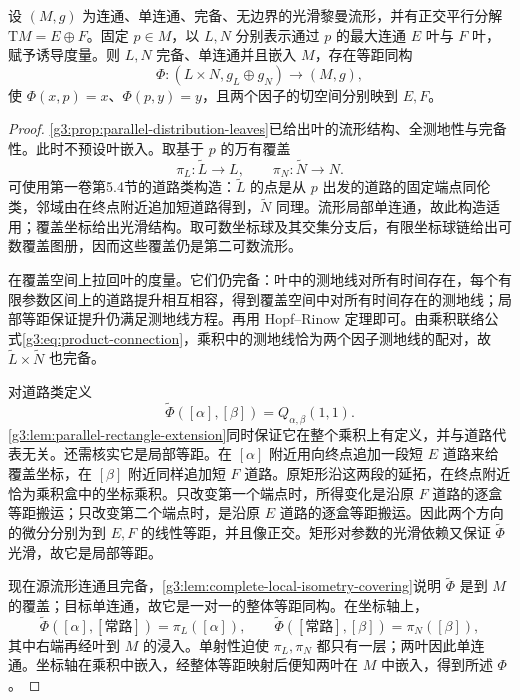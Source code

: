 \begin{theorem}\label{g3:thm:global-parallel-product}
	设 \((M,g)\) 为连通、单连通、完备、无边界的光滑黎曼流形，并有正交平行分解
	\(\mathrm{T}M=E\oplus F\)。固定 \(p\in M\)，以 \(L,N\) 分别表示通过 \(p\) 的最大连通 \(E\) 叶与 \(F\) 叶，赋予诱导度量。则 \(L,N\) 完备、单连通并且嵌入 \(M\)，存在等距同构
	\[
		\Phi:(L\times N,g_L\oplus g_N)\longrightarrow(M,g),
	\]
	使 \(\Phi(x,p)=x\)、\(\Phi(p,y)=y\)，且两个因子的切空间分别映到 \(E,F\)。
\end{theorem}
\begin{proof}
	\cref{g3:prop:parallel-distribution-leaves}已给出叶的流形结构、全测地性与完备性。此时不预设叶嵌入。取基于 \(p\) 的万有覆盖
	\[
		\pi_L:\widetilde L\longrightarrow L,\qquad
		\pi_N:\widetilde N\longrightarrow N.
	\]
	可使用第一卷第5.4节的道路类构造：\(\widetilde L\) 的点是从 \(p\) 出发的道路的固定端点同伦类，邻域由在终点附近追加短道路得到，\(\widetilde N\) 同理。流形局部单连通，故此构造适用；覆盖坐标给出光滑结构。取可数坐标球及其交集分支后，有限坐标球链给出可数覆盖图册，因而这些覆盖仍是第二可数流形。

	在覆盖空间上拉回叶的度量。它们仍完备：叶中的测地线对所有时间存在，每个有限参数区间上的道路提升相互相容，得到覆盖空间中对所有时间存在的测地线；局部等距保证提升仍满足测地线方程。再用 Hopf--Rinow 定理即可。由乘积联络公式\eqref{g3:eq:product-connection}，乘积中的测地线恰为两个因子测地线的配对，故
	\(\widetilde L\times\widetilde N\) 也完备。

	对道路类定义
	\[
		\widetilde\Phi([\alpha],[\beta])
		=Q_{\alpha,\beta}(1,1).
	\]
	\cref{g3:lem:parallel-rectangle-extension}同时保证它在整个乘积上有定义，并与道路代表无关。还需核实它是局部等距。在 \([\alpha]\) 附近用向终点追加一段短 \(E\) 道路来给覆盖坐标，在 \([\beta]\) 附近同样追加短 \(F\) 道路。原矩形沿这两段的延拓，在终点附近恰为乘积盒中的坐标乘积。只改变第一个端点时，所得变化是沿原 \(F\) 道路的逐盒等距搬运；只改变第二个端点时，是沿原 \(E\) 道路的逐盒等距搬运。因此两个方向的微分分别为到 \(E,F\) 的线性等距，并且像正交。矩形对参数的光滑依赖又保证 \(\widetilde\Phi\) 光滑，故它是局部等距。

	现在源流形连通且完备，\cref{g3:lem:complete-local-isometry-covering}说明 \(\widetilde\Phi\) 是到 \(M\) 的覆盖；目标单连通，故它是一对一的整体等距同构。在坐标轴上，
	\[
		\widetilde\Phi([\alpha],[\text{常路}])=\pi_L([\alpha]),
		\qquad
		\widetilde\Phi([\text{常路}],[\beta])=\pi_N([\beta]),
	\]
	其中右端再经叶到 \(M\) 的浸入。单射性迫使 \(\pi_L,\pi_N\) 都只有一层；两叶因此单连通。坐标轴在乘积中嵌入，经整体等距映射后便知两叶在 \(M\) 中嵌入，得到所述 \(\Phi\)。
\end{proof}

